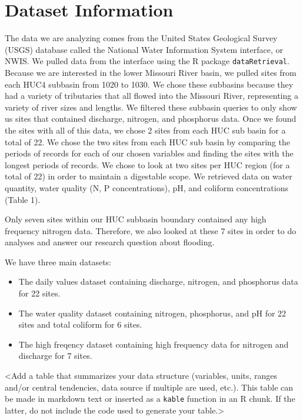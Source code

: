 \documentclass[12pt,]{article}
\begin{document}
\newpage

\hypertarget{dataset-information}{%
\section{Dataset Information}\label{dataset-information}}

The data we are analyzing comes from the United States Geological Survey
(USGS) database called the National Water Information System interface,
or NWIS. We pulled data from the interface using the R package
\texttt{dataRetrieval}. Because we are interested in the lower Missouri
River basin, we pulled sites from each HUC4 subbasin from 1020 to 1030.
We chose these subbasins because they had a variety of tributaries that
all flowed into the Missouri River, representing a variety of river
sizes and lengths. We filtered these subbasin queries to only show us
sites that contained discharge, nitrogen, and phosphorus data. Once we
found the sites with all of this data, we chose 2 sites from each HUC
sub basin for a total of 22. We chose the two sites from each HUC sub
basin by comparing the periods of records for each of our chosen
variables and finding the sites with the longest periods of records. We
chose to look at two sites per HUC region (for a total of 22) in order
to maintain a digestable scope. We retrieved data on water quantity,
water quality (N, P concentrations), pH, and coliform concentrations
(Table 1).

Only seven sites within our HUC subbasin boundary contained any high
frequency nitrogen data. Therefore, we also looked at these 7 sites in
order to do analyses and answer our research question about flooding.

We have three main datasets:

\begin{itemize}
\item
  The daily values dataset containing discharge, nitrogen, and
  phosphorus data for 22 sites.
\item
  The water quality dataset containing nitrogen, phosphorus, and pH for
  22 sites and total coliform for 6 sites.
\item
  The high freqency dataset containing high frequency data for nitrogen
  and discharge for 7 sites.
\end{itemize}

\textless{}Add a table that summarizes your data structure (variables,
units, ranges and/or central tendencies, data source if multiple are
used, etc.). This table can be made in markdown text or inserted as a
\texttt{kable} function in an R chunk. If the latter, do not include the
code used to generate your table.\textgreater{}
\end{document}

